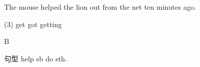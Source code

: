 \begin{question}[tags={xiaoxuect}]
The mouse helped the lion \blank[width=1cm]{} out from the net ten minutes ago.

  \begin{tasks}(3)
    \task get
    \task got
    \task getting
  \end{tasks}

\end{question}
\begin{solution}
B

句型 help sb do sth.
\end{solution}